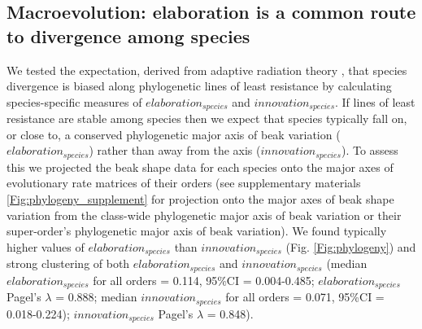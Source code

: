 \documentclass[12pt,letterpaper]{article}
\begin{document}
\subsection{Macroevolution: elaboration is a common route to divergence among species}
We tested the expectation, derived from adaptive radiation theory \cite{schluter1996adaptive,mcglothlin2018adaptive,slater2019hierarchy} %
, that species divergence is biased along phylogenetic lines of least resistance by calculating species-specific measures of $elaboration_{species}$ and $innovation_{species}$.
If lines of least resistance are stable among species then we expect that species typically fall on, or close to, a conserved phylogenetic major axis of beak variation ($elaboration_{species}$) rather than away from the axis ($innovation_{species}$).
To assess this we projected the beak shape data for each species onto %
the major axes of evolutionary rate matrices of their orders (see supplementary materials \ref{Fig:phylogeny_supplement} for projection onto the major axes of beak shape variation from the class-wide phylogenetic major axis of beak variation or their super-order’s phylogenetic major axis of beak variation).
We found typically higher values of $elaboration_{species}$ than $innovation_{species}$ (Fig. \ref{Fig:phylogeny}) %
and strong clustering of both $elaboration_{species}$ and $innovation_{species}$ (median $elaboration_{species}$ for all orders = 0.114, 95\%CI = 0.004-0.485;  $elaboration_{species}$ Pagel's $\lambda$ = 0.888; median $innovation_{species}$ for all orders = 0.071, 95\%CI = 0.018-0.224); $innovation_{species}$ Pagel's $\lambda$ = 0.848).%
\end{document}
